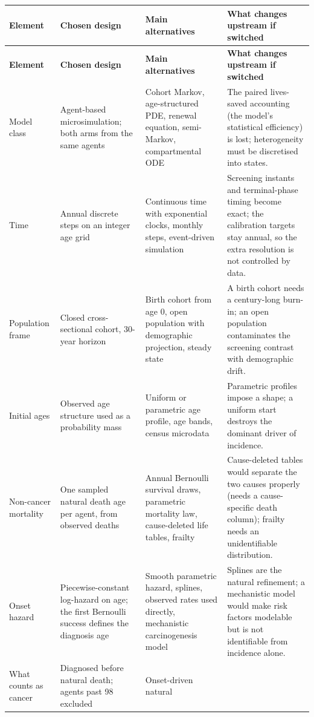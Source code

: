 \documentclass[12pt,a4paper]{article}
\begin{document}
{\footnotesize\setlength{\tabcolsep}{4pt}
\begin{longtable}{@{}p{2.3cm}p{4.5cm}p{4.0cm}p{4.0cm}@{}}
\toprule
\textbf{Element} & \textbf{Chosen design} & \textbf{Main alternatives} & \textbf{What changes upstream if switched} \\
\midrule
\endfirsthead
\toprule
\textbf{Element} & \textbf{Chosen design} & \textbf{Main alternatives} & \textbf{What changes upstream if switched} \\
\midrule
\endhead
\bottomrule
\endlastfoot
Model class & Agent-based microsimulation; both arms from the same agents & Cohort Markov, age-structured PDE,
renewal equation, semi-Markov, compartmental ODE & The paired lives-saved accounting (the model's statistical
efficiency) is lost; heterogeneity must be discretised into states. \\
Time & Annual discrete steps on an integer age grid & Continuous time with exponential clocks, monthly
steps, event-driven simulation & Screening instants and terminal-phase timing become exact; the calibration
targets stay annual, so the extra resolution is not controlled by data. \\
Population frame & Closed cross-sectional cohort, 30-year horizon & Birth cohort from age 0, open population
with demographic projection, steady state & A birth cohort needs a century-long burn-in; an open population
contaminates the screening contrast with demographic drift. \\
Initial ages & Observed age structure used as a probability mass & Uniform or parametric age profile, age
bands, census microdata & Parametric profiles impose a shape; a uniform start destroys the dominant driver of
incidence. \\
Non-cancer mortality & One sampled natural death age per agent, from observed deaths & Annual Bernoulli
survival draws, parametric mortality law, cause-deleted life tables, frailty & Cause-deleted tables would
separate the two causes properly (needs a cause-specific death column); frailty needs an unidentifiable
distribution. \\
Onset hazard & Piecewise-constant log-hazard on age; the first Bernoulli success defines the diagnosis age &
Smooth parametric hazard, splines, observed rates used directly, mechanistic carcinogenesis model & Splines
are the natural refinement; a mechanistic model would make risk factors modelable but is not identifiable
from incidence alone. \\
What counts as cancer & Diagnosed before natural death; agents past 98 excluded & Onset-driven natural

\end{longtable}}
\end{document}
